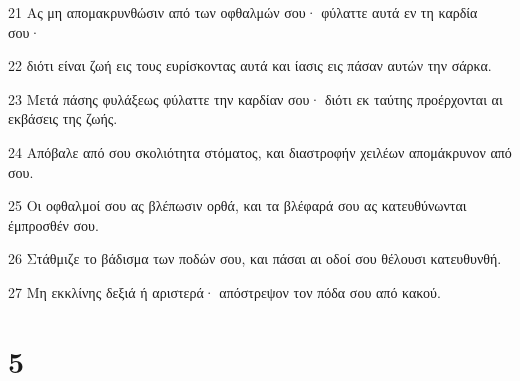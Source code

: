 \par 21 Ας μη απομακρυνθώσιν από των οφθαλμών σου· φύλαττε αυτά εν τη καρδία σου·
\par 22 διότι είναι ζωή εις τους ευρίσκοντας αυτά και ίασις εις πάσαν αυτών την σάρκα.
\par 23 Μετά πάσης φυλάξεως φύλαττε την καρδίαν σου· διότι εκ ταύτης προέρχονται αι εκβάσεις της ζωής.
\par 24 Απόβαλε από σου σκολιότητα στόματος, και διαστροφήν χειλέων απομάκρυνον από σου.
\par 25 Οι οφθαλμοί σου ας βλέπωσιν ορθά, και τα βλέφαρά σου ας κατευθύνωνται έμπροσθέν σου.
\par 26 Στάθμιζε το βάδισμα των ποδών σου, και πάσαι αι οδοί σου θέλουσι κατευθυνθή.
\par 27 Μη εκκλίνης δεξιά ή αριστερά· απόστρεψον τον πόδα σου από κακού.

\chapter{5}

